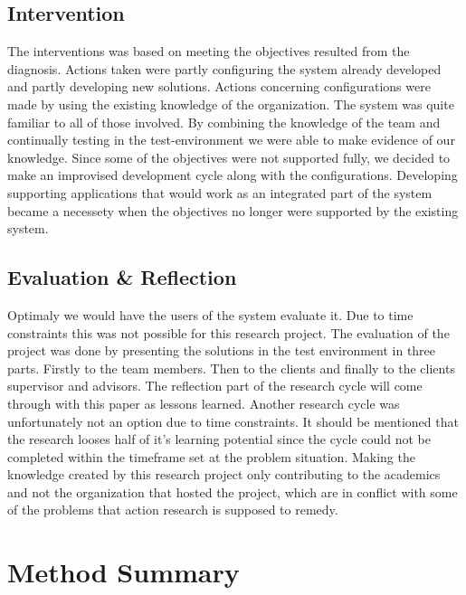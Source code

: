 \subsection{Intervention}
The interventions was based on meeting the objectives resulted from the diagnosis. 
Actions taken were partly configuring the system already developed and partly developing new solutions.
Actions concerning configurations were made by using the existing knowledge of the organization.
The system was quite familiar to all of those involved.
By combining the knowledge of the team and continually testing in the test-environment we were able to make evidence of our knowledge.
Since some of the objectives were not supported fully, we decided to make an improvised development cycle along with the configurations. 
Developing supporting applications that would work as an integrated part of the system became a necessety when the objectives no longer were supported by the existing system.
\subsection{Evaluation \& Reflection}
Optimaly we would have the users of the system evaluate it. 
Due to time constraints this was not possible for this research project. 
The evaluation of the project was done by presenting the solutions in the test environment in three parts.
Firstly to the team members. Then to the clients and finally to the clients supervisor and advisors.
The reflection part of the research cycle will come through with this paper as lessons learned.
Another research cycle was unfortunately not an option due to time constraints.
It should be mentioned that the research looses half of it's learning potential since the cycle could not be completed within the timeframe set at the problem situation. 
Making the knowledge created by this research project only contributing to the academics and not the organization that hosted the project, which are in conflict with some of the problems that action research is supposed to remedy.
\section{Method Summary}

